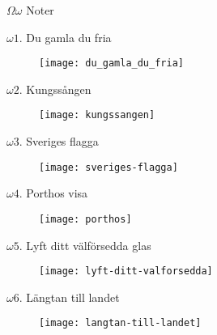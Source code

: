\documentclass[a6paper,11pt]{article}
\begin{document}
\huge$\Omega\omega$ Noter\\
\vspace{-20pt}
\begin{center}
\Large$\omega1$. Du gamla du fria
\end{center}
\vspace{-40pt}
\begin{figure}[!h]
\hspace{-10pt}
\texttt{[image: du\_gamla\_du\_fria]}
\end{figure}

\setlength{\oddsidemargin}{-0.67in}
\begin{center}
\Large$\omega2$. Kungssången
\end{center}
\vspace{-40pt}
\begin{figure}[!h]
\centering
\texttt{[image: kungssangen]}
\end{figure}

\setlength{\oddsidemargin}{-0.47in}
\begin{center}
\Large$\omega 3$. Sveriges flagga
\end{center}
\vspace{-40pt}
\begin{figure}[!h]
\centering
\texttt{[image: sveriges-flagga]}
\end{figure}

\setlength{\oddsidemargin}{-0.67in}
\begin{center}
\Large$\omega4$. Porthos visa
\end{center}
\vspace{-40pt}
\begin{figure}[!h]
\centering
\texttt{[image: porthos]}
\end{figure}

\setlength{\oddsidemargin}{-0.47in}
\begin{center}
\Large$\omega5$. Lyft ditt välförsedda glas
\end{center}
\vspace{-40pt}
\begin{figure}[!h]
\centering
\texttt{[image: lyft-ditt-valforsedda]}
\end{figure}

\setlength{\oddsidemargin}{-0.67in}
\begin{center}
\Large$\omega6$. Längtan till landet
\end{center}
\vspace{-40pt}
\begin{figure}[!h]
\centering
\texttt{[image: langtan-till-landet]}
\end{figure}
\end{document}
